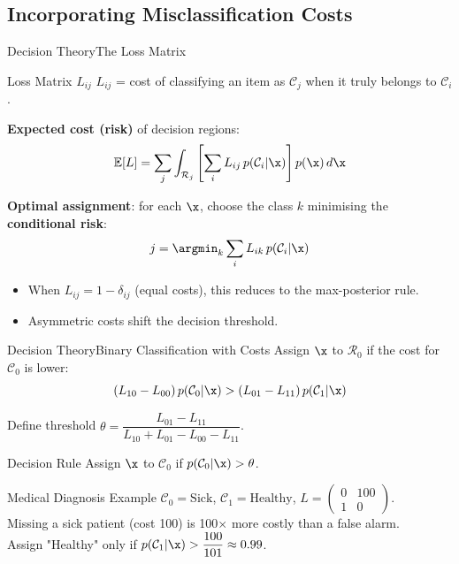 \subsection{Incorporating Misclassification Costs}

\begin{frame}{Decision Theory}{The Loss Matrix}
  \begin{block}{Loss Matrix $L_{ij}$}
    $L_{ij}$ = cost of classifying an item as $\mathcal{C}_j$ when it truly belongs to $\mathcal{C}_i$.
  \end{block}

  \textbf{Expected cost (risk)} of decision regions:
  \[
    \mathbb{E}[L] = \sum_j \int_{\mathcal{R}_j} \left[\sum_i L_{ij}\,p(\mathcal{C}_i|\x)\right] p(\x)\,d\x
  \]

  \textbf{Optimal assignment}: for each $\x$, choose the class $k$ minimising the \textbf{conditional risk}:
  \[
    j = \argmin_k \sum_i L_{ik}\,p(\mathcal{C}_i|\x)
  \]

  \begin{itemize}
    \item When $L_{ij} = 1 - \delta_{ij}$ (equal costs), this reduces to the max-posterior rule.
    \item Asymmetric costs shift the decision threshold.
  \end{itemize}
\end{frame}

\begin{frame}{Decision Theory}{Binary Classification with Costs}
  Assign $\x$ to $\mathcal{R}_0$ if the cost for $\mathcal{C}_0$ is lower:
  \[
    (L_{10} - L_{00})\,p(\mathcal{C}_0|\x) > (L_{01} - L_{11})\,p(\mathcal{C}_1|\x)
  \]

  Define threshold $\theta = \dfrac{L_{01}-L_{11}}{L_{10}+L_{01}-L_{00}-L_{11}}$.

  \begin{block}{Decision Rule}
    Assign $\x$ to $\mathcal{C}_0$ if $p(\mathcal{C}_0|\x) > \theta$.
  \end{block}

  \begin{exampleblock}{Medical Diagnosis Example}
    $\mathcal{C}_0 = \text{Sick}$, $\mathcal{C}_1 = \text{Healthy}$, $L = \begin{pmatrix}0 & 100\\ 1 & 0\end{pmatrix}$.\\
    Missing a sick patient (cost 100) is 100$\times$ more costly than a false alarm.\\[4pt]
    Assign "Healthy" only if $p(\mathcal{C}_1|\x) > \dfrac{100}{101} \approx 0.99$.
  \end{exampleblock}
\end{frame}

